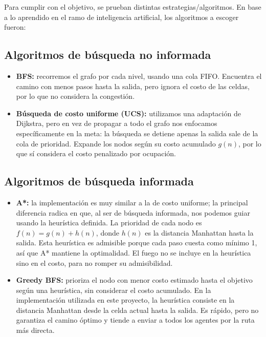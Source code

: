 \documentclass[11pt,a4paper]{article}
\begin{document}
Para cumplir con el objetivo, se prueban distintas estrategias/algoritmos. En base a lo aprendido en el ramo de inteligencia artificial, los algoritmos a escoger fueron:

\subsection*{Algoritmos de búsqueda no informada}

\begin{itemize}
    \item \textbf{BFS:} recorremos el grafo por cada nivel, usando una cola FIFO. Encuentra el camino con menos pasos hasta la salida, pero ignora el costo de las celdas, por lo que no considera la congestión.
    \item \textbf{Búsqueda de costo uniforme (UCS):} utilizamos una adaptación de Dijkstra, pero en vez de propagar a todo el grafo nos enfocamos específicamente en la meta: la búsqueda se detiene apenas la salida sale de la cola de prioridad. Expande los nodos según su costo acumulado $g(n)$, por lo que sí considera el costo penalizado por ocupación.
\end{itemize}

\subsection*{Algoritmos de búsqueda informada}

\begin{itemize}
    \item \textbf{A*:} la implementación es muy similar a la de costo uniforme; la principal diferencia radica en que, al ser de búsqueda informada, nos podemos guiar usando la heurística definida. La prioridad de cada nodo es $f(n) = g(n) + h(n)$, donde $h(n)$ es la distancia Manhattan hasta la salida. Esta heurística es admisible porque cada paso cuesta como mínimo 1, así que A* mantiene la optimalidad. El fuego no se incluye en la heurística sino en el costo, para no romper su admisibilidad.
    \item \textbf{Greedy BFS:} prioriza el nodo con menor costo estimado hasta el objetivo según una heurística, sin considerar el costo acumulado. En la implementación utilizada en este proyecto, la heurística consiste en la distancia Manhattan desde la celda actual hasta la salida. Es rápido, pero no garantiza el camino óptimo y tiende a enviar a todos los agentes por la ruta más directa.
\end{itemize}
\end{document}
